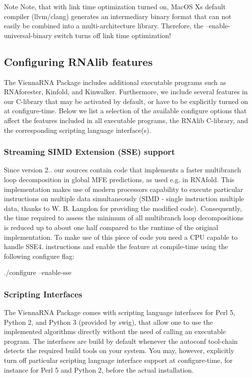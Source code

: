 \begin{DoxyNote}{Note}
Note, that with link time optimization turned on, Mac\+OS X\textquotesingle{}s default compiler (llvm/clang) generates an intermediary binary format that can not easily be combined into a multi-\/architecture library. Therefore, the --enable-\/universal-\/binary switch turns off link time optimization!
\end{DoxyNote}
\hypertarget{install_configuration}{}\subsection{Configuring R\+N\+Alib features}\label{install_configuration}
The Vienna\+R\+NA Package includes additional executable programs such as R\+N\+Aforester, Kinfold, and Kinwalker. Furthermore, we include several features in our C-\/library that may be activated by default, or have to be explicitly turned on at configure-\/time. Below we list a selection of the available configure options that affect the features included in all executable programs, the R\+N\+Alib C-\/library, and the corresponding scripting language interface(s).\hypertarget{install_config_sse}{}\subsubsection{Streaming S\+I\+M\+D Extension (\+S\+S\+E) support}\label{install_config_sse}
Since version 2.. our sources contain code that implements a faster multibranch loop decomposition in global M\+FE predictions, as used e.\+g. in R\+N\+Afold. This implementation makes use of modern processors capability to execute particular instructions on multiple data simultaneously (S\+I\+MD -\/ single instruction multiple data, thanks to W. B. Langdon for providing the modified code). Consequently, the time required to assess the minimum of all multibranch loop decompositions is reduced up to about one half compared to the runtime of the original implementation. To make use of this piece of code you need a C\+PU capable to handle S\+S\+E4. instructions and enable the feature at compile-\/time using the following configure flag\+:

\begin{DoxyVerb}./configure --enable-sse
\end{DoxyVerb}
\hypertarget{install_config_swig}{}\subsubsection{Scripting Interfaces}\label{install_config_swig}
The Vienna\+R\+NA Package comes with scripting language interfaces for Perl 5, Python 2, and Python 3 (provided by swig), that allow one to use the implemented algorithms directly without the need of calling an executable program. The interfaces are build by default whenever the autoconf tool-\/chain detects the required build tools on your system. You may, however, explicitly turn off particular scripting language interface support at configure-\/time, for instance for Perl 5 and Python 2, before the actual installation.

